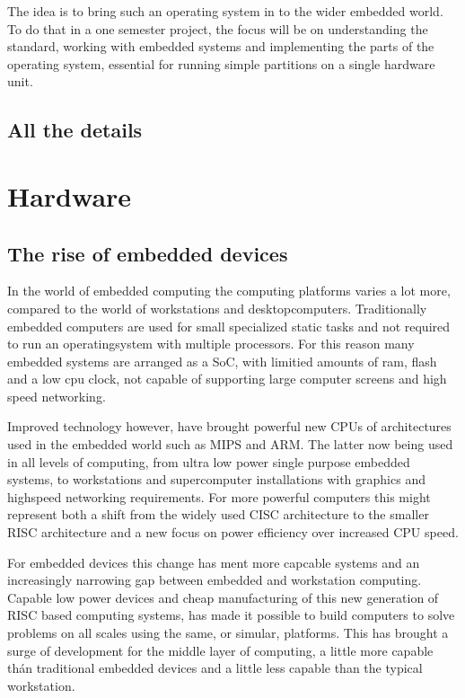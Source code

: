 The idea is to bring such an operating system in to the wider embedded world.
To do that in a one semester project, the focus will be on understanding the standard,
working with embedded systems and implementing the parts of the operating system,
essential for running simple partitions on a single hardware unit.

\subsection{All the details}


\section{Hardware}
\subsection{The rise of embedded devices}
In the world of embedded computing the computing platforms varies a lot more,
compared to the world of workstations and desktopcomputers.
Traditionally embedded computers are used for small specialized static tasks and
not required to run an operatingsystem with multiple processors.
For this reason many embedded systems are arranged as a SoC,
with limitied amounts of ram, flash and a low cpu clock,
not capable of supporting large computer screens and high speed networking.

Improved technology however, have brought powerful new CPUs of architectures used in the embedded world
such as MIPS and ARM.
The latter now being used in all levels of computing, from ultra low power single purpose embedded systems,
to workstations and supercomputer installations with graphics and highspeed networking requirements.
For more powerful computers this might represent both a shift from the widely used CISC architecture
to the smaller RISC architecture and a new focus on power efficiency over increased CPU speed.

For embedded devices this change has ment more capcable systems
and an increasingly narrowing gap between embedded and workstation computing.
Capable low power devices and cheap manufacturing of this new generation of RISC based computing systems,
has made it possible to build computers to solve problems on all scales using the same, or simular, platforms.
This has brought a surge of development for the middle layer of computing,
a little more capable thán traditional embedded devices and a little less capable than the typical workstation.

